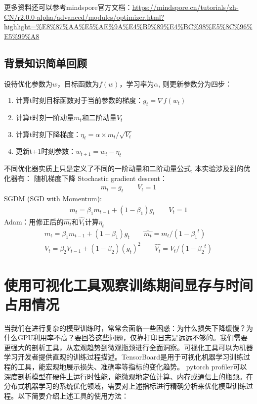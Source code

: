 更多资料还可以参考mindspore官方文档：\url{https://mindspore.cn/tutorials/zh-CN/r2.0.0-alpha/advanced/modules/optimizer.html?highlight=%E8%87%AA%E5%AE%9A%E4%B9%89%E4%BC%98%E5%8C%96%E5%99%A8}

\subsection{背景知识简单回顾}
设待优化参数为$w$，目标函数为$f(w)$，学习率为$\alpha$, 则更新参数分为四步：

\begin{enumerate}
    \item 计算t时刻目标函数对于当前参数的梯度：$g_t = \nabla f(w_t)$
    \item 计算t时刻一阶动量$m_t$和二阶动量$V_t$
    \item 计算t时刻下降梯度：$\eta_t = \alpha \times m_t / \sqrt{V_t}$
    \item 更新t+1时刻参数：$w_{t+1} = w_t - \eta_t$
\end{enumerate}
不同优化器实质上只是定义了不同的一阶动量和二阶动量公式, 本实验涉及到的优化器有：
随机梯度下降 Stochastic gradient descent：
\begin{align} 
m_t = g_t \qquad V_t = 1
\end{align}
SGDM (SGD with Momentum):
\begin{align}
m_t = \beta_1 m_{t-1} + (1-\beta_1) g_t \qquad V_t = 1
\end{align}
Adam：用修正后的$\hat{m_t}$和$\hat{V_t}$计算$\eta_t$
\begin{align} %
    m_t = \beta_1 m_{t-1} + (1-\beta_1) g_t  \qquad \hat{m_t} = m_t/(1-{\beta_{1} }^{t})  \\
    V_t = \beta_2 V_{t-1} + (1-\beta_2) (g_t)^2 \qquad \hat{V_t} = V_t/(1-{\beta_{2} }^{t}) 
\end{align}

\section{使用可视化工具观察训练期间显存与时间占用情况}
当我们在进行复杂的模型训练时，常常会面临一些困惑：为什么损失下降缓慢？为什么GPU利用率不高？要回答这些问题，仅靠打印日志是远远不够的。我们需要更强大的剖析工具，从宏观趋势到微观瓶颈进行全面洞察。可视化工具可以为机器学习开发者提供直观的训练过程描述。TensorBoard是用于可视化机器学习训练过程的工具，能宏观地展示损失、准确率等指标的变化趋势。
pytorch profiler可以深度剖析模型在硬件上运行时性能，能微观地定位计算、内存或通信上的瓶颈。在分布式机器学习的系统优化领域，需要对上述指标进行精确分析来优化模型训练过程。以下简要介绍上述工具的使用方法：

